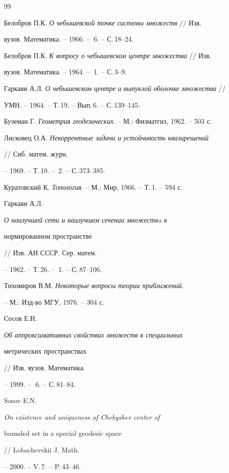 \begin{thebibliography}{99}







Белобров П.К. {\em О чебышевской точке системы множеств} // Изв.


вузов. Математика. -- 1966. -- \No\,6. -- С.\,18--24.




Белобров П.К. {\em К вопросу о чебышевском центре множества} // Изв.


вузов. Математика. -- 1964. -- \No\,1. -- С.\,3--9.




Гаркави А.Л. {\em О чебышевском центре и выпуклой оболочке множества} //


УМН. -- 1964. -- Т.\,19. -- Вып.\,6. -- С.\,139--145.




Буземан Г. {\em Геометрия геодезических}. -- М.: Физматгиз, 1962. -- 503 с.




Лисковец О.А. {\em Некорректные задачи и устойчивость квазирешений}


// Сиб. матем. журн. 


-- 1969. -- Т.\,10. -- \No\,2. -- С.\,373--385.




Куратовский К. {\em Топология}. -- М.: Мир, 1966. -- Т.\,1. -- 594 с.




Гаркави А.Л. {\em О наилучшей сети и наилучшем сечении множествa в 


нормированном пространстве} // Изв. АН СССР. Сер. матем.


-- 1962. -- Т.\,26. -- \No\,1. -- С.\,87--106.




Тихомиров В.М. {\em Некоторые вопросы теории приближений}.


-- М.: Изд-во МГУ, 1976. -- 304 с.




Сосов Е.Н. {\em Об аппроксимативных свойствах множеств в специальных 


метрических пространствах} // Изв. вузов. Математика.


-- 1999. -- \No\,\,6. -- С.\,81--84.




Sosov E.N. {\em On existence and uniqueness of Chebyshev center of 


bounded set in a special geodesic space} // Lobachevskii J. Math.


-- 2000. -- V.\,7. -- P.\,43--46.





\end{thebibliography}





